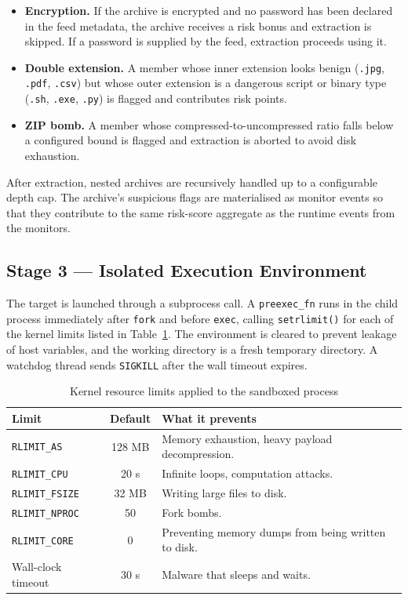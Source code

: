 \documentclass[12pt, a4paper]{report}
\begin{document}
\begin{itemize}
    \item \textbf{Encryption.} If the archive is encrypted and no
          password has been declared in the feed metadata, the archive
          receives a risk bonus and extraction is skipped. If a
          password is supplied by the feed, extraction proceeds using
          it.
    \item \textbf{Double extension.} A member whose inner extension
          looks benign (\texttt{.jpg}, \texttt{.pdf}, \texttt{.csv})
          but whose outer extension is a dangerous script or binary
          type (\texttt{.sh}, \texttt{.exe}, \texttt{.py}) is flagged
          and contributes risk points.
    \item \textbf{ZIP bomb.} A member whose compressed-to-uncompressed
          ratio falls below a configured bound is flagged and
          extraction is aborted to avoid disk exhaustion.
\end{itemize}

After extraction, nested archives are recursively handled up to a
configurable depth cap. The archive's suspicious flags are
materialised as monitor events so that they contribute to the same
risk-score aggregate as the runtime events from the monitors.

\subsection{Stage 3 --- Isolated Execution Environment}

The target is launched through a subprocess call. A \texttt{preexec\_fn}
runs in the child process immediately after \texttt{fork} and before
\texttt{exec}, calling \texttt{setrlimit()} for each of the kernel
limits listed in Table~\ref{tab:sb_rlimits}. The environment is
cleared to prevent leakage of host variables, and the working
directory is a fresh temporary directory. A watchdog thread sends
\texttt{SIGKILL} after the wall timeout expires.

\begin{table}[H]
\centering
\caption{Kernel resource limits applied to the sandboxed process}
\label{tab:sb_rlimits}
\begin{tabular}{|l|c|p{7cm}|}
\hline
\textbf{Limit} & \textbf{Default} & \textbf{What it prevents} \\
\hline
\texttt{RLIMIT\_AS} & 128 MB & Memory exhaustion, heavy payload decompression. \\
\hline
\texttt{RLIMIT\_CPU} & 20 s & Infinite loops, computation attacks. \\
\hline
\texttt{RLIMIT\_FSIZE} & 32 MB & Writing large files to disk. \\
\hline
\texttt{RLIMIT\_NPROC} & 50 & Fork bombs. \\
\hline
\texttt{RLIMIT\_CORE} & 0 & Preventing memory dumps from being written to disk. \\
\hline
Wall-clock timeout & 30 s & Malware that sleeps and waits. \\
\hline
\end{tabular}
\end{table}
\end{document}
